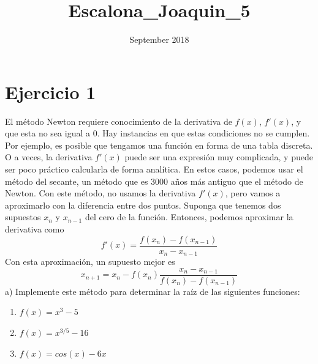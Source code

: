 \documentclass{article}
\title{Escalona\_Joaquin\_5}
\date{September 2018}
\begin{document}
\maketitle

\section{Ejercicio 1}
 El método Newton requiere
conocimiento de la derivativa de $f(x)$, $f'(x)$, y que esta no sea igual a 0. Hay instancias en que
estas condiciones no se cumplen. Por ejemplo, es posible que tengamos una función en
forma de una tabla discreta. O a veces, la derivativa $f'(x)$ puede ser una expresión muy
complicada, y puede ser poco práctico calcularla de forma analítica. En estos casos, podemos
usar el método del secante, un método que es 3000 años más antiguo que el método de
Newton. Con este método, no usamos la derivativa $f'(x)$, pero vamos a aproximarlo con la
diferencia entre dos puntos. Suponga que tenemos dos supuestos $x_n$ y $x_{n-1} $ del cero de la
función. Entonces, podemos aproximar la derivativa como
\begin{equation*}
    f'(x) = \frac{f(x_n)-f(x_{n-1})}{x_n - x_{n-1}}
\end{equation*}
Con esta aproximación, un supuesto mejor es
\begin{equation*}
    x_{n+1} = x_n - f(x_n)\frac{x_n - x_{n-1}}{f(x_n)-f(x_{n-1})}
\end{equation*}
a) Implemente este método para determinar la raíz de las siguientes funciones:

\begin{enumerate}
    \item $f(x) = x^3 - 5$
    \item $f(x) = x^{3/5}-16$
    \item $f(x) = cos(x) - 6x$
\end{enumerate}
\end{document}

